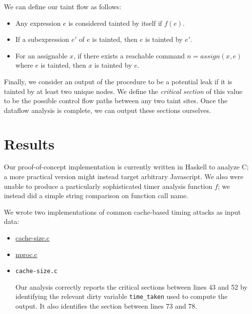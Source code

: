 \documentclass[12pt]{article}
\begin{document}
\begin{multicols*}{2}
  We can define our taint flow as follows:

  \begin{itemize}
    \item Any expression $e$ is considered tainted by itself if $f(e)$.
    \item If a subexpression $e'$ of $e$ is tainted, then $e$ is tainted by
      $e'$.
    \item For an assignable $x$, if there exists a reachable command
      $n = assign(x,e)$ where $e$ is tainted, then $x$ is tainted by $e$.
  \end{itemize}

  Finally, we consider an output of the procedure to be a potential leak if
  it is tainted by at least two unique nodes. We define the
  \textit{critical section} of this value to be the possible control flow
  paths between any two taint sites. Once the dataflow analysis is complete, we
  can output these sections ourselves.

  \section{Results}

  Our proof-of-concept implementation is currently written in Haskell to
  analyze C; a more practical version might instead target arbitrary
  Javascript. We also were unable to produce a particularly sophisticated
  timer analysis function $f$; we instead did a simple string comparison on
  function call name.

  We wrote two implementations of common cache-based timing attacks as input
  data:
  \begin{itemize}
    \item
  \href{https://github.com/jpdoyle/static-analysis-project/blob/master/clock-analysis/data/cache-size.c}
      {cache-size.c}

    \item
      \href{https://github.com/jpdoyle/static-analysis-project/blob/master/clock-analysis/data/nproc.c}
      {nproc.c}
  \end{itemize}

  \begin{itemize}

    \item \texttt{cache-size.c}

      Our analysis correctly reports the
  critical sections between lines 43 and 52 by identifying the relevant dirty
  variable \texttt{time\_taken} used to compute the output. It also identifies
  the section between lines 73 and 78.


\end{itemize}
\end{multicols*}
\end{document}
